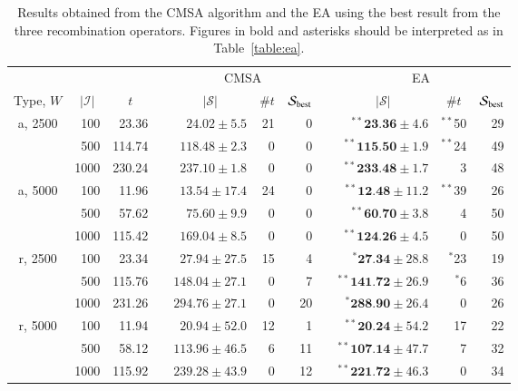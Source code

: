 \documentclass[authoryear]{elsarticle}
\begin{document}
\begin{table}[h!]
\centering
\caption{Results obtained from the CMSA algorithm and the EA using the best result from the three recombination operators. Figures in bold and asterisks should be interpreted as in Table~\ref{table:ea}.}
\footnotesize
\begin{threeparttable}
\begin{tabular}{crrcrrrcrrr}
	\toprule
	& & & & \multicolumn{3}{c}{CMSA} &\phantom{ab}& \multicolumn{3}{c}{EA}\\
	\cmidrule{5-7} \cmidrule{9-11}
	\multicolumn{1}{c}{Type, $W$} & \multicolumn{1}{c}{$|\mathcal{I}|$} & \multicolumn{1}{c}{$t$\tnote{$a$}} && \multicolumn{1}{c}{$|\mathcal{S}|$\tnote{$b$}} & \multicolumn{1}{c}{$\# t$\tnote{$c$}} & \multicolumn{1}{c}{$\mathcal{S}_{\textup{best}}$\tnote{$d$}} && \multicolumn{1}{c}{$|\mathcal{S}|$} & \multicolumn{1}{c}{$\# t$} & \multicolumn{1}{c}{$\mathcal{S}_{\textup{best}}$}\\
	\midrule
	a, 2500 & 100 & 23.36 && $24.02 \pm 5.5$ & 21 & 0 && $^{**}\textbf{23.36} \pm 4.6$ & $^{**}$50 & 29 \\
	& 500 & 114.74 && $118.48 \pm 2.3$ & 0 & 0 && $^{**}\textbf{115.50} \pm 1.9$ & $^{**}$24 & 49 \\
	& 1000 & 230.24 && $237.10 \pm 1.8$ & 0 & 0 && $^{**}\textbf{233.48} \pm 1.7$ & 3 & 48 \\
	\midrule
	a, 5000 & 100 & 11.96 && $13.54 \pm 17.4$ & 24 & 0 && $^{**}\textbf{12.48} \pm 11.2$ & $^{**}$39 & 26 \\
	& 500 & 57.62 && $75.60 \pm 9.9$ & 0 & 0 && $^{**}\textbf{60.70} \pm 3.8$ & 4 & 50 \\
	& 1000 & 115.42 && $169.04 \pm 8.5$ & 0 & 0 && $^{**}\textbf{124.26} \pm 4.5$ & 0 & 50 \\
	\midrule
	\midrule
	r, 2500 & 100 & 23.34 && $27.94 \pm 27.5$ & 15 & 4 && $^{*}\textbf{27.34} \pm 28.8$ & $^{*}$23 & 19 \\
	& 500 & 115.76 && $148.04 \pm 27.1$ & 0 & 7 && $^{**}\textbf{141.72} \pm 26.9$ & $^{*}$6 & 36 \\
	& 1000 & 231.26 && $294.76 \pm 27.1$ & 0 & 20 && $^{*}\textbf{288.90} \pm 26.4$ & 0 & 26 \\
	\midrule
	r, 5000 & 100 & 11.94 && $20.94 \pm 52.0$ & 12 & 1 && $^{**}\textbf{20.24} \pm 54.2$ & 17 & 22 \\
	& 500 & 58.12 && $113.96 \pm 46.5$ & 6 & 11 && $^{**}\textbf{107.14} \pm 47.7$ & 7 & 32 \\
	& 1000 & 115.92 && $239.28 \pm 43.9$ & 0 & 12 && $^{**}\textbf{221.72} \pm 46.3$ & 0 & 34 \\

\end{tabular}
\end{threeparttable}
\end{table}
\end{document}
